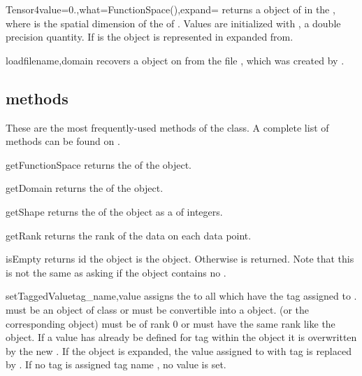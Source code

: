 \begin{funcdesc}{Tensor4}{value=0.,what=FunctionSpace(),expand=\False}
returns a \Data object of \Shape {} in the \FunctionSpace {},
where  is the spatial dimension of the \Domain of .
Values are initialized with , a double precision quantity. If  is \True
the \Data object is represented in expanded from.
\end{funcdesc}

\begin{funcdesc}{load}{filename,domain}
recovers a \Data object on \Domain {} from the file , which was created by .
\end{funcdesc}

\subsection{\Data methods}
These are the most frequently-used methods of the
\Data class. A complete list of methods can be found on \ReferenceGuide.
\begin{methoddesc}[Data]{getFunctionSpace}{}
returns the \FunctionSpace of the object.
\end{methoddesc}

\begin{methoddesc}[Data]{getDomain}{}
returns the \Domain  of the object.
\end{methoddesc}

\begin{methoddesc}[Data]{getShape}{}
returns the \Shape  of the object as a  of
integers.
\end{methoddesc}

\begin{methoddesc}[Data]{getRank}{}
returns the rank of the data on each data point. 
\end{methoddesc}

\begin{methoddesc}[Data]{isEmpty}{}
returns \True id the \Data object is the \EmptyData object.
Otherwise \False is returned.
Note that this is not the same as asking if the object contains no \DataSamplePoints.
\end{methoddesc}

\begin{methoddesc}[Data]{setTaggedValue}{tag_name,value}
assigns the  to all \DataSamplePoints which have the tag
assigned to .  must be an object of class
 or must be convertible into a
 object.  (or the corresponding
 object) must be of rank $0$ or must have the
same rank like the object.
If a value has already be defined for tag  within the object
it is overwritten by the new .  If the object is expanded,
the value assigned to \DataSamplePoints with tag  is replaced by
. If no tag is assigned tag name , no value is set.
\end{methoddesc}

